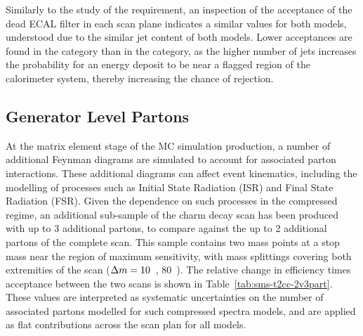 Similarly to the study of the \mhtmet requirement, an inspection of the
acceptance of the dead ECAL filter in each scan plane indicates a similar
values for both models, understood due to the similar jet content of both 
models. Lower acceptances are found in the \njhigh category than in the \njlow
category, as the higher number of jets increases the probability for an energy
deposit to be near a flagged region of the calorimeter system, thereby
increasing the chance of rejection.


\subsection{Generator Level Partons}
At the \MADGRAPH matrix element stage of the MC simulation production, a number
of additional Feynman diagrams are simulated to account for associated parton 
interactions. These additional diagrams can affect event kinematics,
including the modelling of processes such as Initial State Radiation (ISR) and
Final State Radiation (FSR). Given the dependence on such processes in the
compressed regime, an additional sub-sample of the charm decay scan 
has been produced with up to 3 additional partons, to compare against the up to
2 additional partons of the complete scan. This sample contains two mass points 
at a stop mass near the region of maximum sensitivity, with mass splittings 
covering both extremities of the scan ($\Delta m = 10$~\gev, 80~\gev). The relative
change in efficiency times 
acceptance between the two scans is shown in Table~\ref{tab:sms-t2cc-2v3part}. 
These values are interpreted as systematic uncertainties on the number of 
associated partons modelled for such compressed spectra models, and are applied 
as flat contributions across the scan plan for all models.

